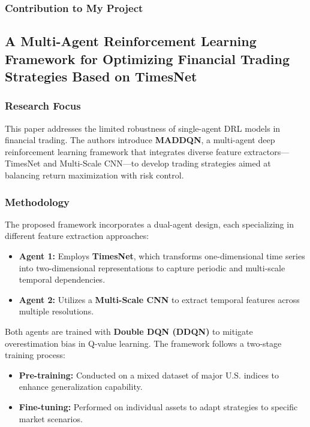 \documentclass[12pt,a4paper]{report}
\begin{document}
\subsubsection{Contribution to My Project}


\subsection{A Multi-Agent Reinforcement Learning Framework for Optimizing Financial Trading Strategies Based on TimesNet \cite{huang2023timesnet}}

\subsubsection{Research Focus}
This paper addresses the limited robustness of single-agent DRL models in financial trading. The authors introduce \textbf{MADDQN}, a multi-agent deep reinforcement learning framework that integrates diverse feature extractors—TimesNet and Multi-Scale CNN—to develop trading strategies aimed at balancing return maximization with risk control.

\subsubsection{Methodology}
The proposed framework incorporates a dual-agent design, each specializing in different feature extraction approaches:
\begin{itemize}
    \item \textbf{Agent 1:} Employs \textbf{TimesNet}, which transforms one-dimensional time series into two-dimensional representations to capture periodic and multi-scale temporal dependencies.  
    \item \textbf{Agent 2:} Utilizes a \textbf{Multi-Scale CNN} to extract temporal features across multiple resolutions.  
\end{itemize}

Both agents are trained with \textbf{Double DQN (DDQN)} to mitigate overestimation bias in Q-value learning. The framework follows a two-stage training process:
\begin{itemize}
    \item \textbf{Pre-training:} Conducted on a mixed dataset of major U.S. indices to enhance generalization capability.  
    \item \textbf{Fine-tuning:} Performed on individual assets to adapt strategies to specific market scenarios.  
\end{itemize}
\end{document}
